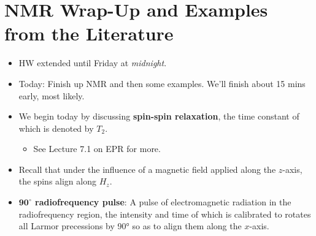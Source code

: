 \documentclass[../notes.tex]{subfiles}
\begin{document}
\section{NMR Wrap-Up and Examples from the Literature}
\begin{itemize}
    \item {}HW extended until Friday at \emph{midnight}.
    \item Today: Finish up NMR and then some examples. We'll finish about 15 mins early, most likely.
    \item We begin today by discussing \textbf{spin-spin relaxation}, the time constant of which is denoted by $T_2$.
    \begin{itemize}
        \item See Lecture 7.1 on EPR for more.
    \end{itemize}
    \item Recall that under the influence of a magnetic field applied along the $z$-axis, the spins align along $H_z$.
    \item \textbf{$\bm{90^\circ}$ radiofrequency pulse}: A pulse of electromagnetic radiation in the radiofrequency region, the intensity and time of which is calibrated to rotates all Larmor precessions by \ang{90} so as to align them along the $x$-axis.
    \begin{figure}[h!]
        \centering
\end{figure}
\end{itemize}
\end{document}
